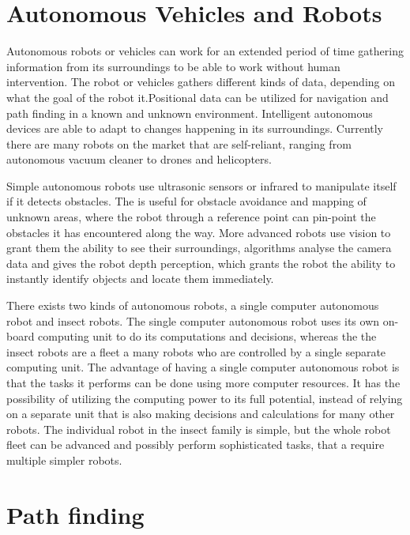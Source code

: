 \clearpage
\section{Autonomous Vehicles and Robots}

Autonomous robots or vehicles can work for an extended period of time gathering information from its surroundings to be able to work without human intervention. The robot or vehicles gathers different kinds of data, depending on what the goal of the robot it.Positional data can be utilized for navigation and path finding in a known and unknown environment. Intelligent autonomous devices are able to adapt to changes happening in its surroundings.
Currently there are many robots on the market that are self-reliant, ranging from autonomous vacuum cleaner to drones and helicopters. \cite{autonomousbasic}

Simple autonomous robots use ultrasonic sensors or infrared to manipulate itself if it detects obstacles. The is useful for obstacle avoidance and mapping of unknown areas, where the robot through a reference point can pin-point the obstacles it has encountered along the way.
More advanced robots use vision to grant them the ability to see their surroundings, algorithms analyse the camera data and gives the robot depth perception, which grants the robot the ability to instantly identify objects and locate them immediately.\cite{obstacles}

There exists two kinds of autonomous robots, a single computer autonomous robot and insect robots. The single computer autonomous robot uses its own on-board computing unit to do its computations and decisions, whereas the the insect robots are a fleet a many robots who are controlled by a single separate computing unit.
The advantage of having a single computer autonomous robot is that the tasks it performs can be done using more computer resources. It has the possibility of utilizing the computing power to its full potential, instead of relying on a separate unit that is also making decisions and calculations for many other robots.
The individual robot in the insect family is simple, but the whole robot fleet can be advanced and possibly perform sophisticated tasks, that a require multiple simpler robots.\cite{singleandinsect}



\section{Path finding}
